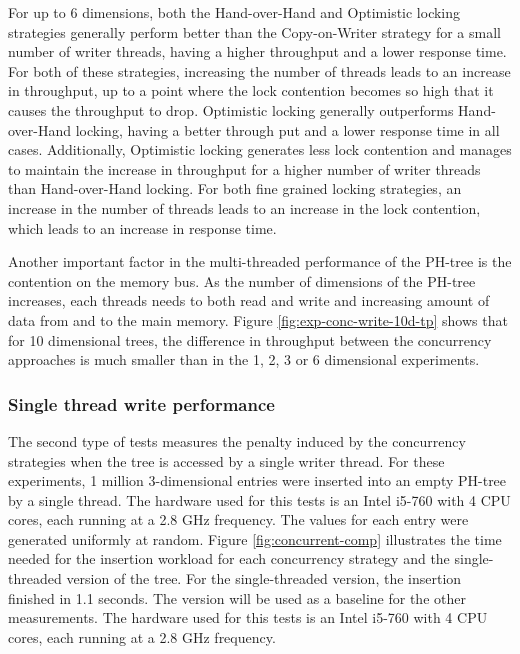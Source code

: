 \documentclass[11pt,a4paper]{globis-book}
\begin{document}
For up to 6 dimensions, both the Hand-over-Hand and Optimistic locking strategies generally perform better than the Copy-on-Writer strategy for a small number of writer threads, having a higher throughput and a lower response time. For both of these strategies, increasing the number of threads leads to an increase in throughput, up to a point where the lock contention becomes so high that it causes the throughput to drop. Optimistic locking generally outperforms Hand-over-Hand locking, having a better through put and a lower response time in all cases. Additionally, Optimistic locking generates less lock contention and manages to maintain the increase in throughput for a higher number of writer threads than Hand-over-Hand locking. For both fine grained locking strategies, an increase in the number of threads leads to an increase in the lock contention, which leads to an increase in response time.

Another important factor in the multi-threaded performance of the PH-tree is the contention on the memory bus. As the number of dimensions of the PH-tree increases, each threads needs to both read and write and increasing amount of data from and to the main memory. Figure \ref{fig:exp-conc-write-10d-tp} shows that for 10 dimensional trees, the difference in throughput between the concurrency approaches is much smaller than in the 1, 2, 3 or 6 dimensional experiments. 

\subsubsection{Single thread write performance}

The second type of tests measures the penalty induced by the concurrency strategies when the tree is accessed by a single writer thread. For these experiments, 1 million 3-dimensional entries were inserted into an empty PH-tree by a single thread. The hardware used for this tests is an Intel i5-760 with 4 CPU cores, each running at a 2.8 GHz frequency. The values for each entry were generated uniformly at random. Figure \ref{fig:concurrent-comp} illustrates the time needed for the insertion workload for each concurrency strategy and the single-threaded version of the tree. For the single-threaded version, the insertion finished in 1.1 seconds. The version will be used as a baseline for the other measurements. The hardware used for this tests is an Intel i5-760 with 4 CPU cores, each running at a 2.8 GHz frequency. 
\end{document}
